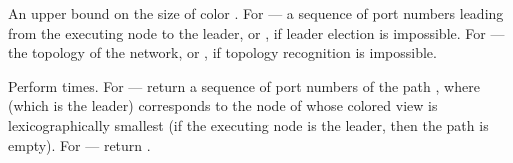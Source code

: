 \documentclass[a4paper,10pt]{article}
\begin{document}
\begin{algorithm} \caption{}
\begin{algorithmic}
\REQUIRE An upper bound  on the size of color .
\ENSURE  For  --- a sequence of port numbers leading from the executing node to the leader, or , if leader election is impossible.
         For  --- the topology of the network, or , if topology recognition is impossible.

\STATE 
\STATE 
\STATE Perform   times.
   \RETURN 
\ELSE
   \STATE For  --- return a sequence of port numbers of the path , where  (which is the leader) corresponds to the node of  whose colored view is lexicographically smallest (if the executing node is the leader, then the path is empty).
   \STATE For  --- return .
\ENDIF
\end{algorithmic}
\end{algorithm}
\end{document}
